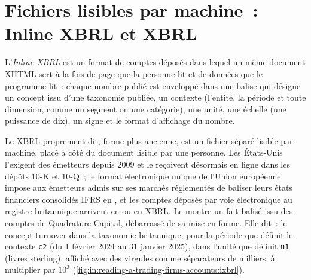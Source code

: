\section{Fichiers lisibles par machine~: Inline XBRL et XBRL}

\begin{definition}\label{def:in:reading-a-trading-firms-accounts:ixbrl}
L'\emph{Inline XBRL} est un format de comptes déposés dans lequel un même document XHTML sert à la fois de page
que la personne lit et de données que le programme lit~: chaque nombre publié est enveloppé dans une balise qui désigne un concept
issu d'une taxonomie publiée, un contexte (l'entité, la période et toute dimension, comme un segment ou une catégorie), une unité,
une échelle (une puissance de dix), un signe et le format d'affichage du nombre.
\end{definition}

Le XBRL proprement dit, forme plus ancienne, est un fichier séparé lisible par machine, placé à côté du document lisible par une
personne. Les États-Unis l'exigent des émetteurs depuis 2009 et le reçoivent désormais en ligne dans les dépôts 10-K et 10-Q~; le
format électronique unique de l'Union européenne impose aux émetteurs admis sur ses marchés réglementés de baliser leurs états
financiers consolidés IFRS en , et les comptes déposés par voie électronique au registre britannique arrivent en  ou en XBRL.
Le  montre un fait balisé issu des comptes de Quadrature Capital, débarrassé de sa mise en forme.
\label{lst:in:reading-a-trading-firms-accounts:tag}
Elle dit~: le concept turnover dans la taxonomie britannique, pour la période que définit le contexte \texttt{c2} (du 1 février 2024
au 31 janvier 2025), dans l'unité que définit \texttt{u1} (livres sterling), affiché avec des virgules comme séparateurs de milliers, à
multiplier par $10^3$ (\cref{fig:in:reading-a-trading-firms-accounts:ixbrl}).

